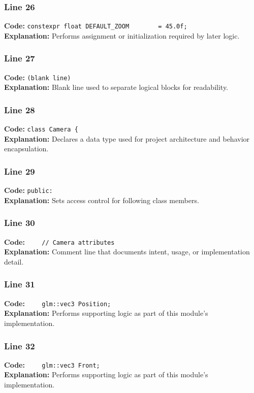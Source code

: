 \documentclass[11pt,a4paper]{article}
\begin{document}
\subsubsection*{Line 26}
\textbf{Code:} \verb|constexpr float DEFAULT_ZOOM        = 45.0f;|\\
\textbf{Explanation:} Performs assignment or initialization required by later logic.

\subsubsection*{Line 27}
\textbf{Code:} \texttt{(blank line)}\\
\textbf{Explanation:} Blank line used to separate logical blocks for readability.

\subsubsection*{Line 28}
\textbf{Code:} \verb|class Camera {|\\
\textbf{Explanation:} Declares a data type used for project architecture and behavior encapsulation.

\subsubsection*{Line 29}
\textbf{Code:} \verb|public:|\\
\textbf{Explanation:} Sets access control for following class members.

\subsubsection*{Line 30}
\textbf{Code:} \verb|    // Camera attributes|\\
\textbf{Explanation:} Comment line that documents intent, usage, or implementation detail.

\subsubsection*{Line 31}
\textbf{Code:} \verb|    glm::vec3 Position;|\\
\textbf{Explanation:} Performs supporting logic as part of this module's implementation.

\subsubsection*{Line 32}
\textbf{Code:} \verb|    glm::vec3 Front;|\\
\textbf{Explanation:} Performs supporting logic as part of this module's implementation.
\end{document}
